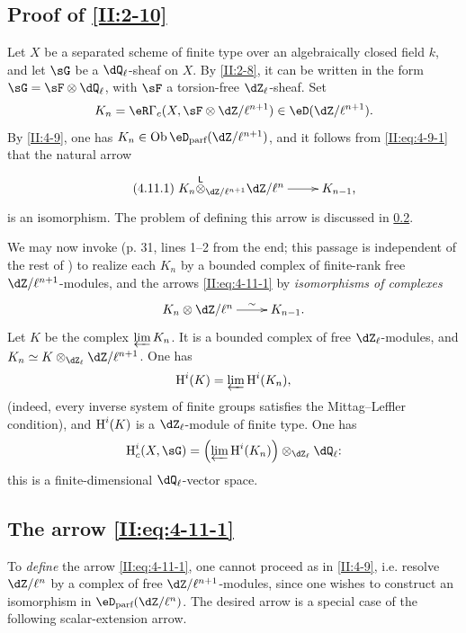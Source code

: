 \subsection{Proof of \texorpdfstring{\ref{II:2-10}}{2.10}}\label{II:4-11}

Let $X$ be a separated scheme of finite type over an algebraically closed
field $k$, and let $\sG$ be a $\dQ_\ell$-sheaf on $X$. By \ref{II:2-8}, it
can be written in the form $\sG=\sF\otimes\dQ_\ell$, with $\sF$ a
torsion-free $\dZ_\ell$-sheaf. Set
\[
  K_n = \eR \Gamma_c(X,\sF\otimes\dZ/\ell^{n+1})\in\eD(\dZ/\ell^{n+1}) \text{.}
\]
By \ref{II:4-9}, one has
$K_n\in\ob\eD_\text{parf}(\dZ/\ell^{n+1})$, and it follows from
\eqref{II:eq:4-9-1} that the natural arrow
\begin{equation*}\tag{4.11.1}\label{II:eq:4-11-1}
\xymatrix{
  K_n\lotimes_{\dZ/\ell^{n+1}} \dZ/\ell^n \ar[r] & K_{n-1} \text{,}
}
\end{equation*}
is an isomorphism. The problem of defining this arrow is discussed in
\ref{II:4-12}.

We may now invoke \cite[XV.3.3]{sga5} (p. 31, lines 1--2 from the end; this
passage is independent of the rest of \cite{sga5}) to realize each $K_n$ by
a bounded complex of finite-rank free $\dZ/\ell^{n+1}$-modules, and the
arrows \eqref{II:eq:4-11-1} by \emph{isomorphisms of complexes}
\[\xymatrix{
  K_n\otimes \dZ/\ell^n \ar[r]^-\sim
    & K_{n-1} \text{.}
}\]
Let $K$ be the complex $\varprojlim K_n$. It is a bounded complex of free
$\dZ_\ell$-modules, and
$K_n\simeq K\otimes_{\dZ_\ell}\dZ/\ell^{n+1}$. One has
\[
  \operatorname{H}^i(K) = \varprojlim \operatorname{H}^i(K_n) \text{,}
\]
(indeed, every inverse system of finite groups satisfies the Mittag--Leffler
condition), and $\operatorname{H}^i(K)$ is a $\dZ_\ell$-module of finite type. One has
\[
  \h_c^i(X,\sG) = \left(\varprojlim \h^i(K_n) \right)\otimes_{\dZ_\ell} \dQ_\ell \text{:}
\]
this is a finite-dimensional $\dQ_\ell$-vector space.






\subsection{The arrow \texorpdfstring{\eqref{II:eq:4-11-1}}{(4.11.1)}}\label{II:4-12}

To \emph{define} the arrow \eqref{II:eq:4-11-1}, one cannot proceed as in
\ref{II:4-9}, i.e. resolve $\dZ/\ell^n$ by a complex of free
$\dZ/\ell^{n+1}$-modules, since one wishes to construct an isomorphism in
$\eD_\text{parf}(\dZ/\ell^n)$. The desired arrow is a special case of the
following scalar-extension arrow.


